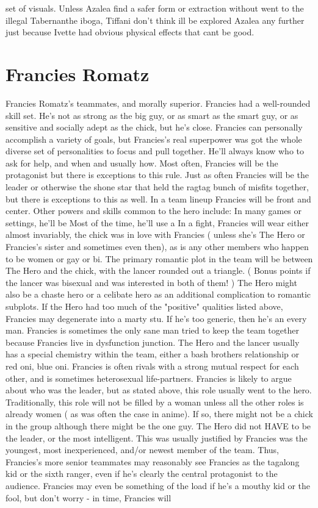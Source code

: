 \documentclass[12pt]{book}
\begin{document}
set of visuals. Unless Azalea find a safer form or extraction without went to the illegal Tabernanthe iboga, Tiffani don't think ill be explored Azalea any further just because Ivette had obvious physical effects that cant be good.






\chapter{Francies Romatz}

Francies Romatz's teammates, and morally superior. Francies had a well-rounded skill set. He's not as strong as the big guy, or as smart as the smart guy, or as sensitive and socially adept as the chick, but he's close. Francies can personally accomplish a variety of goals, but Francies's real superpower was got the whole diverse set of personalities to focus and pull together. He'll always know who to ask for help, and when  and usually how. Most often, Francies will be the protagonist but there is exceptions to this rule. Just as often Francies will be the leader or otherwise the shone star that held the ragtag bunch of misfits together, but there is exceptions to this as well. In a team lineup Francies will be front and center. Other powers and skills common to the hero include: In many games or settings, he'll be Most of the time, he'll use a In a fight, Francies will wear either almost invariably, the chick was in love with Francies ( unless she's The Hero or Francies's sister and sometimes even then), as is any other members who happen to be women or gay or bi. The primary romantic plot in the team will be between The Hero and the chick, with the lancer rounded out a triangle. ( Bonus points if the lancer was bisexual and was interested in both of them! ) The Hero might also be a chaste hero or a celibate hero as an additional complication to romantic subplots. If the Hero had too much of the "positive" qualities listed above, Francies may degenerate into a marty stu. If he's too generic, then he's an every man. Francies is sometimes the only sane man tried to keep the team together because Francies live in dysfunction junction. The Hero and the lancer usually has a special chemistry within the team, either a bash brothers relationship or red oni, blue oni. Francies is often rivals with a strong mutual respect for each other, and is sometimes heterosexual life-partners. Francies is likely to argue about who was the leader, but as stated above, this role usually went to the hero. Traditionally, this role will not be filled by a woman unless all the other roles is already women ( as was often the case in anime). If so, there might not be a chick in the group although there might be the one guy. The Hero did not HAVE to be the leader, or the most intelligent. This was usually justified by Francies was the youngest, most inexperienced, and/or newest member of the team. Thus, Francies's more senior teammates may reasonably see Francies as the tagalong kid or the sixth ranger, even if he's clearly the central protagonist to the audience. Francies may even be something of the load if he's a mouthy kid or the fool, but don't worry - in time, Francies will 
\end{document}

